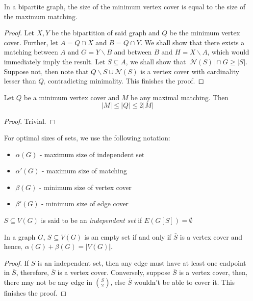 \begin{theorem}
    In a bipartite graph, the size of the minimum vertex cover is equal to the size of the maximum matching.
\end{theorem}
\begin{proof}
    Let $X, Y$ be the bipartition of said graph and $Q$ be the minimum vertex cover. Further, let $A = Q\cap X$ and $B = Q\cap Y$. We shall show that there exists a matching between $A$ and $G = Y\backslash B$ and between $B$ and $H = X\backslash A$, which would immediately imply the result. Let $S\subseteq A$, we shall show that $|\mathcal{N}(S)|\cap G\ge |S|$. Suppose not, then note that $Q\backslash S\cup\mathcal{N}(S)$ is a vertex cover with cardinality lesser than $Q$, contradicting minimality. This finishes the proof.
\end{proof}

\begin{proposition}
    Let $Q$ be a minimum vertex cover and $M$ be any maximal matching. Then 
    \begin{equation*}
        |M|\le|Q|\le2|M|
    \end{equation*}
\end{proposition}
\begin{proof}
    Trivial.
\end{proof}

\begin{definition}
    For optimal sizes of sets, we use the following notation:
    \begin{itemize}
        \item $\alpha(G)$ - maximum size of independent set 
        \item $\alpha'(G)$ - maximum size of matching 
        \item $\beta(G)$ - minimum size of vertex cover 
        \item $\beta'(G)$ - minimum size of edge cover
    \end{itemize}
\end{definition}

\begin{definition}
    $S\subseteq V(G)$ is said to be an \textit{independent set} if $E(G[S])=\emptyset$
\end{definition}

\begin{lemma}
    In a graph $G$, $S\subseteq V(G)$ is an empty set if and only if $\overline{S}$ is a vertex cover and hence, $\alpha(G) + \beta(G) = |V(G)|$.
\end{lemma}
\begin{proof}
    If $S$ is an independent set, then any edge must have at least one endpoint in $\overline{S}$, therefore, $\overline{S}$ is a vertex cover.
    Conversely, suppose $\overline{S}$ is a vertex cover, then, there may not be any edge in $\binom{S}{2}$, else $\overline{S}$ wouldn't be able to cover it. This finishes the proof.
\end{proof}


